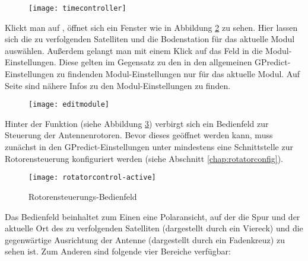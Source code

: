 \begin{figure}[h]
	\centering
	\texttt{[image: timecontroller]}
	\caption{}
	\label{fig:timecontroller} 
\end{figure}

Klickt man auf , öffnet sich ein Fenster wie in Abbildung \ref{fig:editmodule} zu sehen. Hier lassen sich die zu verfolgenden Satelliten und die Bodenstation für das aktuelle Modul auswählen. Außerdem gelangt man mit einem Klick auf das Feld  in die Modul-Einstellungen. Diese gelten im Gegensatz zu den in den allgemeinen GPredict-Einstellungen zu findenden Modul-Einstellungen nur für das aktuelle Modul. Auf Seite \pageref{modulesettingsgeneral} sind nähere Infos zu den Modul-Einstellungen zu finden.
\label{modulesettingsspecific}

\begin{figure}[h]
	\centering
	\texttt{[image: editmodule]}
	\caption{}
	\label{fig:editmodule} 
\end{figure}

\clearpage

Hinter der Funktion  (siehe Abbildung \ref{fig:rotatorcontrol}) verbirgt sich ein Bedienfeld zur Steuerung der Antennenrotoren. Bevor dieses geöffnet werden kann, muss zunächst in den GPredict-Einstellungen unter  mindestens eine Schnittstelle zur Rotorensteuerung konfiguriert werden (siehe Abschnitt \ref{chap:rotatorconfig}). 
\begin{figure}[h]
	\centering
	\texttt{[image: rotatorcontrol-active]}
	\caption{Rotorensteuerungs-Bedienfeld}
	\label{fig:rotatorcontrol} 
\end{figure}

Das Bedienfeld beinhaltet zum Einen eine Polaransicht, auf der die Spur und der aktuelle Ort des zu verfolgenden Satelliten (dargestellt durch ein Viereck) und die gegenwärtige Ausrichtung der Antenne (dargestellt durch ein Fadenkreuz) zu sehen ist. Zum Anderen sind folgende vier Bereiche verfügbar:

